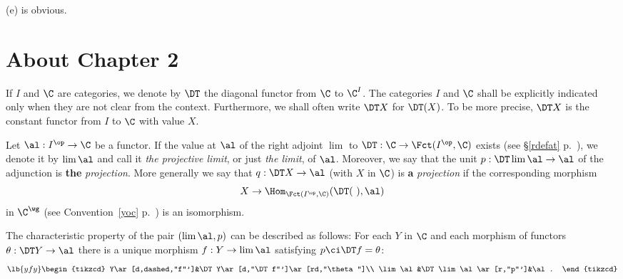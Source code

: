 \documentclass[12pt]{article}
\theoremstyle{remark}
\theoremstyle{definition}
\begin{document}
(e) is obvious.


\section{About Chapter 2}



\begin{nota}
If $I$ and $\C$ are categories, we denote by $\DT$\index{$\DT$} the diagonal functor from $\C$ to $\C^I$. The categories $I$ and $\C$ shall be explicitly indicated only when they are not clear from the context. Furthermore, we shall often write $\DT X$ for $\DT(X)$. To be more precise, $\DT X$ is the constant functor from $I$ to $\C$ with value $X$.
\end{nota}

\begin{df} 
Let $\al:I^{\op}\to\C$ be a functor. If the value at $\al$ of the right adjoint $\lim$ to $\DT:\C\to\Fct(I^{\op},\C)$ exists (see \S\ref{rdefat} p.~), we denote it by $\lim\al$ and call it {\em the projective limit}, or just {\em the limit}, of $\al$. Moreover, we say that the unit $p:\DT\lim\al\to\al$ of the adjunction is \textbf{the} \emph{projection}. More generally we say that $q:\DT X\to\al$ (with $X$ in $\C$) is \textbf{a} \emph{projection} if the corresponding morphism 
$$
X\to\Hom_{\Fct(I^{\op},\C)}(\DT(\ ),\al)
$$ 
in $\C^\wg$ (see Convention~\ref{yoc} p.~) is an isomorphism.
\end{df}

The characteristic property of the pair $(\lim\al,p)$ can be described as follows: For each $Y$ in $\C$ and each morphism of functors $\theta:\DT Y\to\al$ there is a unique morphism $f:Y\to\lim\al$ satisfying $p\ci\DT f=\theta$: 
\begin{equation}\lb{yfy}
\begin{tikzcd}
Y\ar[d,dashed,"f"']&\DT Y\ar[d,"\DT f"']\ar[rd,"\theta"]\\ 
\lim\al&\DT\lim\al\ar[r,"p"']&\al.
\end{tikzcd}
\end{equation} 

%
\end{document}
